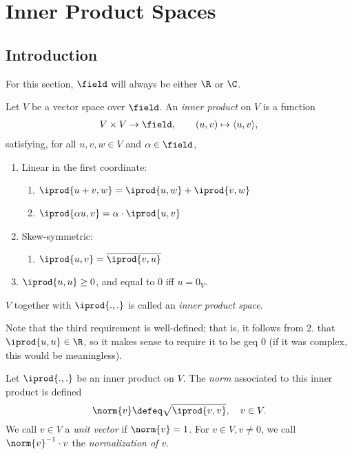 \section{Inner Product Spaces}

\subsection{Introduction}

For this section, $\field$ will always be either $\R$ or $\C$.

\begin{definition}
    Let $V$ be a vector space over $\field$. An \emph{inner product} on $V$ is a function \begin{align*}
        V \times V  \to \field, \qquad (u, v) \mapsto \langle u, v\rangle,
    \end{align*}
    satisfying, for all $u, v,w \in V$ and $\alpha \in \field$, 
    \begin{enumerate}
        \item Linear in the first coordinate:
        \begin{enumerate}
            \item $\iprod{u + v, w} = \iprod{u,w} + \iprod{v, w}$
            \item $\iprod{\alpha u, v} = \alpha \cdot \iprod{u, v}$
        \end{enumerate}
        \item Skew-symmetric:
        \begin{enumerate}
            \item $\iprod{u, v} = \overline{\iprod{v, u}}$
        \end{enumerate}
        \item $\iprod{u, u} \geq 0$, and equal to $0$ iff $u = 0_V$.
    \end{enumerate}
    $V$ together with $\iprod{.,.}$ is called an \emph{inner product space}.
\end{definition}

\begin{remark}
 Note that the third requirement is well-defined; that is, it follows from 2. that $\iprod{u,u} \in \R$, so it makes sense to require it to be geq 0 (if it was complex, this would be meaningless).
\end{remark}

\begin{definition}
    Let $\iprod{.,.}$ be an inner product on $V$. The \emph{norm} associated to this inner product is defined \[
    \norm{v} \defeq \sqrt{\iprod{v,v}}, \quad v \in V.
    \]
    We call $v \in V$ a \emph{unit vector} if $\norm{v} = 1$. For $v \in V, v \neq 0$, we call $\norm{v}^{-1} \cdot v$ the \emph{normalization of $v$}.
\end{definition}

